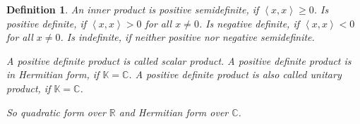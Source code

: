\documentclass{article}
\newtheorem{definition}{Definition}  \numberwithin{definition}{section}
\newcommand{\angel}[1]{\left\langle#1\right\rangle}
\begin{document}
\begin{definition}
  An inner product is \emph{positive semidefinite}, if $\angel{x, x} \geq 0$.
  Is \emph{positive definite}, if $\angel{x, x} > 0$ for all $x \neq 0$.
  Is \emph{negative definite}, if $\angel{x, x} < 0$ for all $x \neq 0$.
  Is \emph{indefinite}, if neither positive nor negative semidefinite.

  A positive definite product is called \emph{scalar product}.
  A positive definite product is in \emph{Hermitian form}, if $\mathbb K = \mathbb C$.
  A positive definite product is also called \emph{unitary product}, if $\mathbb K = \mathbb C$.

  So quadratic form over $\mathbb R$ and Hermitian form over $\mathbb C$.
\end{definition}
\end{document}
